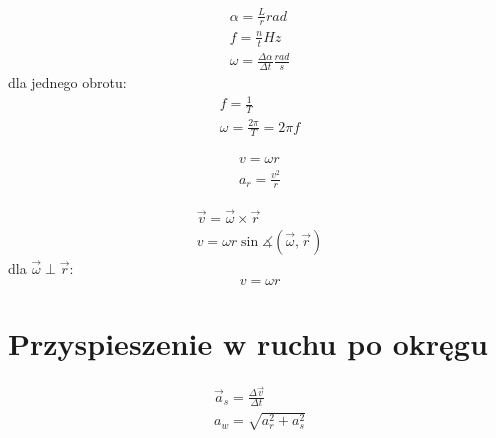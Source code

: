 \begin{gather*}
  \alpha = \frac Lr \unit{rad}\\
  f = \frac nt \unit{Hz}\\
  \omega = \frac{\Delta \alpha}{\Delta t} \unit{\frac{rad}{s}}
\end{gather*}
dla jednego obrotu:
\begin{gather*}
  f = \frac 1 T\\
  \omega = \frac{2\pi}{T} = 2\pi f
\end{gather*}

\begin{gather*}
  v = \omega r\\
  a_r = \frac{v^2}{r}
\end{gather*}

\begin{gather*}
  \vec v = \vec \omega \times \vec r\\
  v = \omega r \sin\measuredangle(\vec \omega, \vec r)
\end{gather*}
dla $\vec \omega \perp \vec r$:
\begin{equation*}
  v = \omega r
\end{equation*}

\section{Przyspieszenie w ruchu po okręgu}
\begin{gather*}
  \vec a_s = \frac{\Delta \vec v}{\Delta t}\\[0.5em]
  a_w = \sqrt{a_r^2 + a_s^2}
\end{gather*}

